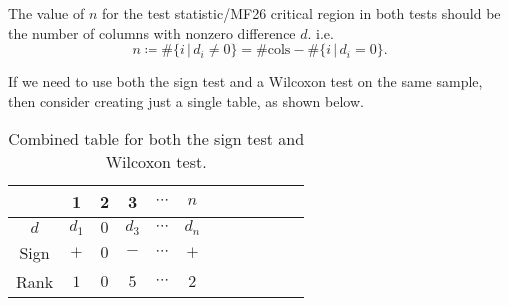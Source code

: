 \begin{note}\hypertarget{non-parametric-tests-n-value}{}
  The value of \(n\) for the test statistic/MF26 critical region in both tests should be the number of columns with nonzero difference \(d\). i.e.
  \[n\coloneq\#\{i \,\vert\, d_i\neq 0\}=\#\text{cols}-\#\{i \,\vert\, d_i=0\}.\]
\end{note}
\begin{note}
  If we need to use both the sign test and a Wilcoxon test on the same sample, then consider creating just a single table, as shown below. 
  \begin{table}[H]
    \centering
    \begin{tabular}{|Sc|Sc|Sc|Sc|Sc|Sc|}
       & 1 & 2 & 3 & \(\cdots\) & \(n\)\\
      \hline 
      \(d\) & \(d_1\) & \(0\) & \(d_3\) & \(\cdots\) & \(d_n\)\\
      \hline
      Sign & \(+\) & \(0\) & \(-\) & \(\cdots\) & \(+\)\\
      \hline
      Rank & \(1\) & \(0\) & \(5\) & \(\cdots\) & \(2\)\\
      \hline
    \end{tabular}
    \caption{Combined table for both the sign test and Wilcoxon test.}
    \label{table:sign-Wilcoxon-combined}
  \end{table}
\end{note}
